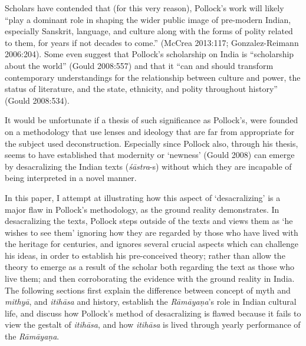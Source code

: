 Scholars have contended that (for this very reason), Pollock’s work will likely “play a dominant role in shaping the wider public image of pre-modern Indian, especially Sanskrit, language, and culture along with the forms of polity related to them, for years if not decades to come.” (McCrea 2013:117; Gonzalez-Reimann 2006:204). Some even suggest that Pollock’s scholarship on India is “scholarship about the world” (Gould 2008:557) and that it “can and should transform contemporary understandings for the relationship between culture and power, the status of literature, and the state, ethnicity, and polity throughout history” (Gould 2008:534).

It would be unfortunate if a thesis of such significance as Pollock’s, were founded on a methodology that use lenses and ideology that are far from appropriate for the subject used deconstruction. Especially since Pollock also, through his thesis, seems to have established that modernity or ‘newness’ (Gould 2008) can emerge by desacralizing the Indian texts (\textit{śāstra}-s) without which they are incapable of being interpreted in a novel manner.

In this paper, I attempt at illustrating how this aspect of ‘desacralizing’ is a major flaw in Pollock’s methodology, as the ground reality demonstrates. In desacralizing the texts, Pollock steps outside of the texts and views them as ‘he wishes to see them’ ignoring how they are regarded by those who have lived with the heritage for centuries, and ignores several crucial aspects which can challenge his ideas, in order to establish his pre-conceived theory; rather than allow the theory to emerge as a result of the scholar both regarding the text as those who live them; and then corroborating the evidence with the ground reality in India. The following sections first explain the difference between concept of myth and \textit{mithyā}, and \textit{itihāsa} and history, establish the \textit{Rāmāyaṇa}’s role in Indian cultural life, and discuss how Pollock’s method of desacralizing is flawed because it fails to view the gestalt of \textit{itihāsa}, and how \textit{itihāsa} is lived through yearly performance of the \textit{Rāmāyaṇa}.


